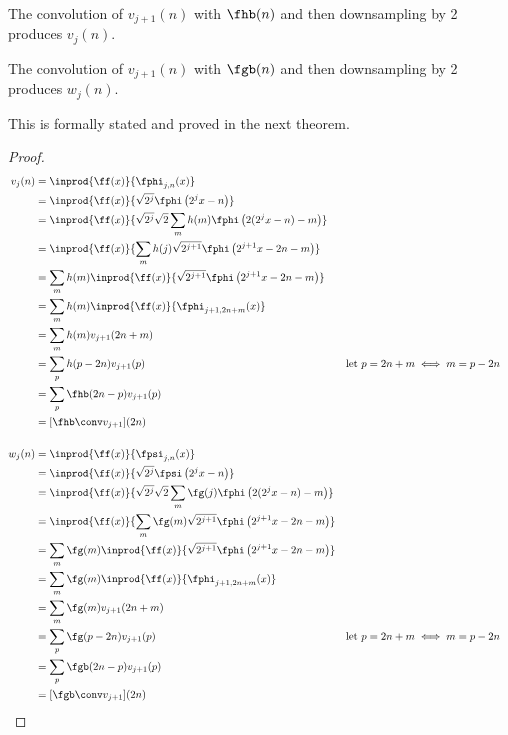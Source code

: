 \begin{liste}
   \item The convolution  of $v_{j+1}(n)$ with $\fhb(n)$ 
         and then downsampling by 2 produces $v_j(n)$.
   \item The convolution of $v_{j+1}(n)$ with $\fgb(n)$ 
         and then downsampling by 2 produces $w_j(n)$.
\end{liste}
This is formally stated and proved in the next theorem.
\begin{theorem}
\end{theorem}
\begin{proof}
\begin{align*}
    v_j(n) 
      &= \inprod{\ff(x)}{\fphi_{j,n}(x)} 
    \\&= \inprod{\ff(x)}{\sqrt{2^j}\fphi\left(2^jx-n \right)}
    \\&= \inprod{\ff(x)}{\sqrt{2^j}\sqrt{2}\sum_m h(m)\fphi\left(2(2^jx-n)-m \right)}
    \\&= \inprod{\ff(x)}{\sum_m h(j)\sqrt{2^{j+1}}\fphi\left(2^{j+1}x-2n -m \right)}
    \\&= \sum_m h(m)\inprod{\ff(x)}{\sqrt{2^{j+1}}\fphi\left(2^{j+1}x-2n -m \right)}
    \\&= \sum_m h(m)\inprod{\ff(x)}{\fphi_{j+1,2n+m}(x)}
    \\&= \sum_m h(m)v_{j+1}(2n+m)
    \\&= \sum_p h(p-2n)v_{j+1}(p)
      && \text{let }p=2n+m \iff m=p-2n
    \\&= \sum_p \fhb(2n-p) v_{j+1}(p)
    \\&= [\fhb \conv v_{j+1}](2n)
\\ 
\\
    w_j(n)
      &= \inprod{\ff(x)}{\fpsi_{j,n}(x)} 
    \\&= \inprod{\ff(x)}{\sqrt{2^j}\fpsi\left(2^jx-n \right)}
    \\&= \inprod{\ff(x)}{\sqrt{2^j}\sqrt{2}\sum_m \fg(j)\fphi\left(2(2^jx-n)-m \right)}
    \\&= \inprod{\ff(x)}{\sum_m \fg(m)\sqrt{2^{j+1}}\fphi\left(2^{j+1}x-2n -m \right)}
    \\&= \sum_m \fg(m)\inprod{\ff(x)}{\sqrt{2^{j+1}}\fphi\left(2^{j+1}x-2n -m \right)}
    \\&= \sum_m \fg(m)\inprod{\ff(x)}{\fphi_{j+1,2n+m}(x)}
    \\&= \sum_m \fg(m)v_{j+1}(2n+m)
    \\&= \sum_p \fg(p-2n)v_{j+1}(p)
      && \text{let }p=2n+m \iff m=p-2n
    \\&= \sum_p \fgb(2n-p)v_{j+1}(p) 
    \\&= [\fgb \conv v_{j+1}](2n)
   \end{align*}
\end{proof}

